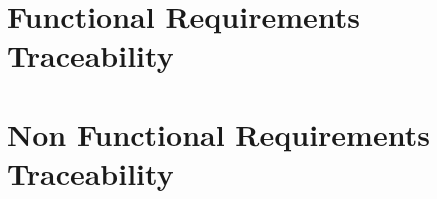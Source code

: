 \section{Functional Requirements Traceability}
\label{sec: functional_requirements_traceability}%


\section{Non Functional Requirements Traceability}
\label{sec: non_functional_requirements_traceability}%
